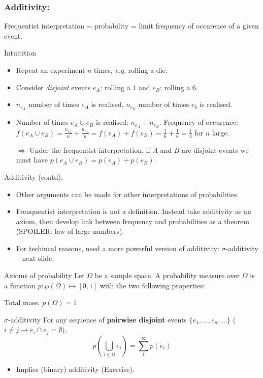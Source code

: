 \documentclass{beamer}
\begin{document}
\begin{frame}
  \frametitle{Additivity:}
  Frequentist interpretation $\sim$ probability = limit frequency of occurence of a given event.

  \begin{exampleblock}{Intuitition}
    \begin{itemize}
    \item Repeat an experiment $n$ times, \emph{e.g.} rolling a die.
    \item Consider \emph{disjoint} events $e_A$: rolling a $1$ and $e_B$: rolling a $6$.
    \item $n_{e_A}$ number of times $e_A$ is realised, $n_{e_B}$ number of times $e_b$ is realised.
    \item Number of times $e_A \cup e_B$ is realised: $n_{e_A} + n_{e_B}$. Frequency of occurence: $f(e_A \cup e_B) = \frac{n_{e_A}}{n} + \frac{n_{e_B}}{n} = f(e_A) + f(e_B) \sim \frac{1}{6} + \frac{1}{6} = \frac{1}{3}$ for $n$ large.
    \item[$\Rightarrow$] \alert{Under the frequentist interpretation, if $A$ and $B$ are disjoint events we must have $p(e_A \cup e_B) = p(e_A) + p(e_B)$.}
    \end{itemize}
  \end{exampleblock}
\end{frame}

\begin{frame}{Additivity (contd).}
  \begin{itemize}
  \item Other arguments can be made for other interpretations of probabilities.
  \item Frenquentist interpretation is not a definition. Instead take additivity as an axiom, then develop link between frequency and probabilities as a theorem (SPOILER: law of large numbers).
  \item For techincal reasons, need a more powerful version of additivity: $\sigma$-additivity -- next slide.
  \end{itemize}
\end{frame}


\begin{frame}{Axioms of probability}
  Let $\Omega$ be a sample space. A probability measure over $\Omega$ is a function $p: \wp(\Omega) \mapsto [0,1]$ with the two following properties:

  \begin{block}{Total mass.}
    $p(\Omega) = 1$
  \end{block}

  \begin{block}{$\sigma$-additivity}
    For any sequence of {\bf pairwise disjoint} events $\{e_1, \dots, e_n, \dots\}$ ($i \neq j \rightarrow e_i \cap e_j = \emptyset$),
    \[p(\bigcup_{i \in \mathbb{N}} e_i) = \sum^{\infty}_{1} p(e_i) \]
    \begin{itemize}
    \item Implies (binary) additivity (Exercise).
    \end{itemize}
  \end{block}
\end{frame}
\end{document}
